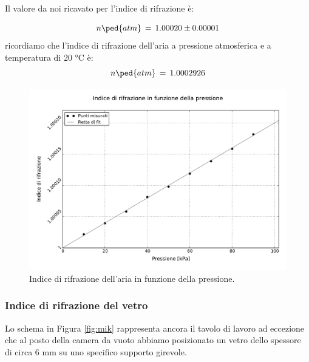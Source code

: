Il valore da noi ricavato per l'indice di rifrazione è:

\begin{equation}
	n\ped{atm} \, = \, 1.00020 \pm 0.00001
\end{equation}
%
ricordiamo che l'indice di rifrazione dell'aria a pressione atmosferica e a temperatura di 20 $\si{\degreeCelsius}$ è:
\begin{equation}
n\ped{atm} \, = \, 1.000 292 6
\end{equation}


\begin{figure}[t]
    \centering
        \includegraphics[width=\textwidth]{graph.pdf}
        \caption{Indice di rifrazione dell'aria in funzione della pressione.}
        \label{fig:enne_press}
\end{figure}

\subsubsection{Indice di rifrazione del vetro}


Lo schema in Figura \ref{fig:mik} rappresenta ancora il tavolo di lavoro ad eccezione che al posto della camera da vuoto abbiamo posizionato un vetro dello spessore di circa 6 \si{\milli\metre} su uno specifico supporto girevole.

